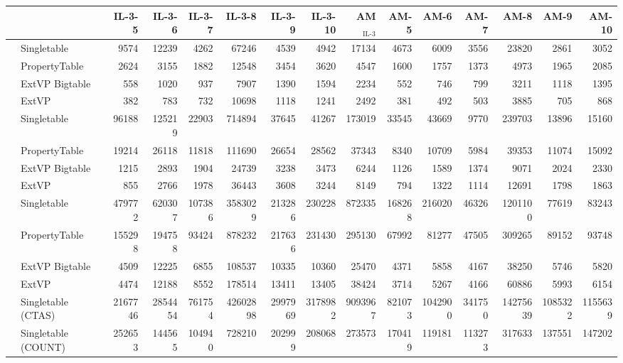 \documentclass[
  a4paper,
  twocolumn
]{scrartcl}
\begin{document}
\begin{sidewaystable*}[htbp]
  	\begin{tabular*}{\textwidth}{ @{\extracolsep{\fill}} llrrrrr|r|rrrrrrr }
		\midrule
	  	& & IL-3-5 & IL-3-6 & IL-3-7 & IL-3-8 & IL-3-9 & IL-3-10 & AM$_{\text{IL-3}}$ & AM-5 & AM-6 & AM-7 & AM-8 & AM-9 & AM-10  \\ 
		\midrule
		\multirow{4}{*}{\rotatebox{90}{SF10}}  
		& Singletable & 9574 & 12239 & 4262 & 67246 & 4539 & 4942 & 17134 & 4673 & 6009 & 3556 & 23820 & 2861 & 3052 \\
		& PropertyTable & 2624 & 3155 & 1882 & 12548 & 3454 & 3620 & 4547 & 1600 & 1757 & 1373 & 4973 & 1965 & 2085 \\
		& ExtVP Bigtable & 558 & 1020 & 937 & 7907 & 1390 & 1594 & 2234 & 552 & 746 & 799 & 3211 & 1118 & 1395 \\
		& ExtVP & 382 & 783 & 732 & 10698 & 1118 & 1241 & 2492 & 381 & 492 & 503 & 3885 & 705 & 868 \\
		\midrule
		\multirow{4}{*}{\rotatebox{90}{SF100}} 
		& Singletable & 96188 & 125219 & 22903 & 714894 & 37645 & 41267 & 173019 & 33545 & 43669 & 9770 & 239703 & 13896 & 15160 \\
		& PropertyTable & 19214 & 26118 & 11818 & 111690 & 26654 & 28562 & 37343 & 8340 & 10709 & 5984 & 39353 & 11074 & 15092 \\
		& ExtVP Bigtable & 1215 & 2893 & 1904 & 24739 & 3238 & 3473 & 6244 & 1126 & 1589 & 1374 & 9071 & 2024 & 2330 \\
		& ExtVP & 855 & 2766 & 1978 & 36443 & 3608 & 3244 & 8149 & 794 & 1322 & 1114 & 12691 & 1798 & 1863 \\
		\midrule
		\multirow{4}{*}{\rotatebox{90}{SF1000}} 
		& Singletable & 479772 & 620307 & 107386 & 3583029 & 213286 & 230228 & 872335 & 168268 & 216020 & 46326 & 1201100 & 77619 & 83243 \\
		& PropertyTable & 155298 & 194758 & 93424 & 878232 & 217636 & 231430 & 295130 & 67992 & 81277 & 47505 & 309265 & 89152 & 93748 \\
		& ExtVP Bigtable & 4509 & 12225 & 6855 & 108537 & 10335 & 10360 & 25470 & 4371 & 5858 & 4167 & 38250 & 5746 & 5820 \\
		& ExtVP & 4474 & 12188 & 8552 & 178514 & 13411 & 13405 & 38424 & 3714 & 5267 & 4166 & 60886 & 5993 & 6154 \\
		\midrule
		\multirow{7}{*}{\rotatebox{90}{SF10000}} 
		& Singletable (CTAS) & 2167746 & 2854454 & 761754 & 42602898 & 2997969 & 3178982 & 9093967 & 821073 & 1042900 & 341750 & 14275639 & 1085322 & 1155639 \\
		& Singletable (COUNT) & 252653 & 144565 & 104940 & 728210 & 202999 & 208068 & 273573 & 170419 & 119181 & 113273 & 317633 & 137551 & 147202 \\

\end{tabular*}
\end{sidewaystable*}
\end{document}
